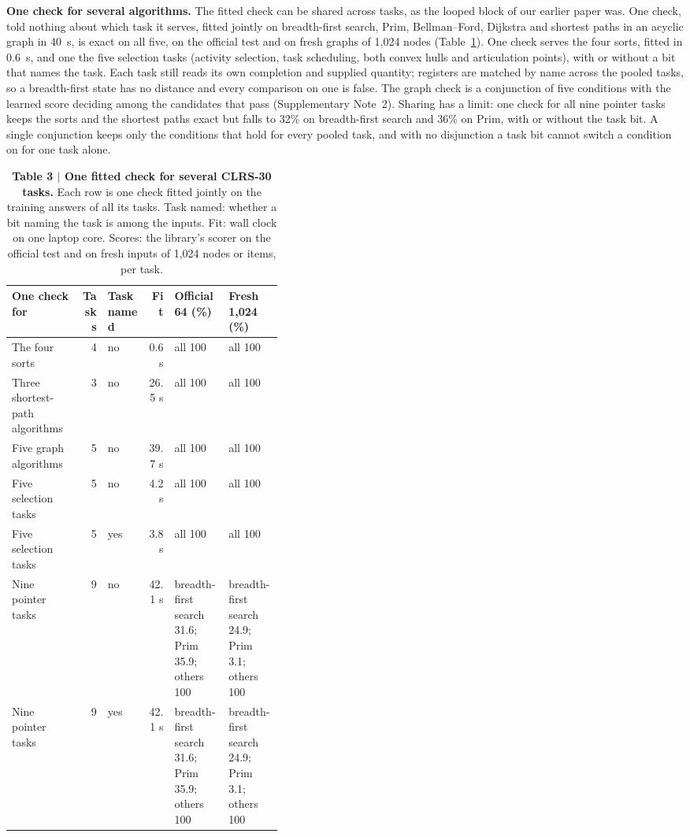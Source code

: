 \documentclass[10pt]{article}
\newcommand{\figlabel}[2]{\textbf{#1 $|$ #2}}
\begin{document}
\textbf{One check for several algorithms.} The fitted check can be shared across tasks, as the looped block of our
earlier paper was. One check, told nothing about which task it serves, fitted jointly on breadth-first search, Prim,
Bellman--Ford, Dijkstra and shortest paths in an acyclic graph in 40~s, is exact on all five, on the
official test and on fresh graphs of 1,024 nodes (Table~\ref{tab:shared}). One check serves the four sorts, fitted in
0.6~s, and one the five selection tasks (activity selection, task scheduling, both convex hulls and
articulation points), with or without a bit that names the task. Each task still reads its own completion and supplied
quantity; registers are matched by name across the pooled tasks, so a breadth-first state has no distance and every
comparison on one is false. The graph check is a conjunction of five conditions with the learned score deciding among the
candidates that pass (Supplementary Note~2). Sharing has a limit: one check for all nine pointer tasks keeps the sorts and the shortest paths exact but
falls to 32\% on breadth-first search and 36\% on Prim, with or without the task bit.
A single conjunction keeps only the conditions that hold for every pooled task, and with no disjunction a task bit
cannot switch a condition on for one task alone.

\begin{table}[tbp]\centering\scriptsize
\caption{\figlabel{Table 3}{One fitted check for several CLRS-30 tasks.} Each row is one check fitted jointly on the
training answers of all its tasks. Task named: whether a bit naming the task is among the inputs. Fit: wall clock on one
laptop core. Scores: the library's scorer on the official test and on fresh inputs of 1,024 nodes or items, per task.}
\label{tab:shared}
\begin{tabular}{lrlrp{0.2\linewidth}p{0.2\linewidth}}\toprule
One check for & Tasks & Task named & Fit & Official 64 (\%) & Fresh 1,024 (\%) \\\midrule
The four sorts & 4 & no & 0.6 s & all 100 & all 100 \\
Three shortest-path algorithms & 3 & no & 26.5 s & all 100 & all 100 \\
Five graph algorithms & 5 & no & 39.7 s & all 100 & all 100 \\
Five selection tasks & 5 & no & 4.2 s & all 100 & all 100 \\
Five selection tasks & 5 & yes & 3.8 s & all 100 & all 100 \\
Nine pointer tasks & 9 & no & 42.1 s & breadth-first search 31.6; Prim 35.9; others 100 & breadth-first search 24.9; Prim 3.1; others 100 \\
Nine pointer tasks & 9 & yes & 42.1 s & breadth-first search 31.6; Prim 35.9; others 100 & breadth-first search 24.9; Prim 3.1; others 100 \\
\bottomrule\end{tabular}
\end{table}
\end{document}
